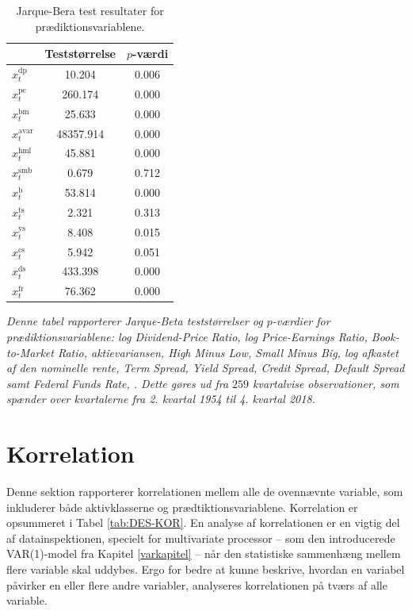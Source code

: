 \documentclass[
  a4paper,
  oneside]{memoir}
\begin{document}
\begin{table}[H]

\caption{\label{tab:JB-TILSTANDSVARIABLE}Jarque-Bera test resultater for prædiktionsvariablene.}
\centering
\begin{threeparttable}
\begin{tabular}[t]{lcc}
\toprule
  & Teststørrelse & $p$-værdi\\
\midrule
\rowcolor{gray!6}  $x_t^{\text{dp}}$ & 10.204 & 0.006\\
$x_t^{\text{pe}}$ & 260.174 & 0.000\\
\rowcolor{gray!6}  $x_t^{\text{bm}}$ & 25.633 & 0.000\\
$x_t^{\text{avar}}$ & 48357.914 & 0.000\\
\rowcolor{gray!6}  $x_t^{\text{hml}}$ & 45.881 & 0.000\\
$x_t^{\text{smb}}$ & 0.679 & 0.712\\
\rowcolor{gray!6}  $x_t^{\text{b}}$ & 53.814 & 0.000\\
$x_t^{\text{ts}}$ & 2.321 & 0.313\\
\rowcolor{gray!6}  $x_t^{\text{ys}}$ & 8.408 & 0.015\\
$x_t^{\text{cs}}$ & 5.942 & 0.051\\
\rowcolor{gray!6}  $x_t^{\text{ds}}$ & 433.398 & 0.000\\
$x_t^{\text{fr}}$ & 76.362 & 0.000\\
\bottomrule
\end{tabular}
\begin{tablenotes}
\item \textit{Denne tabel rapporterer Jarque-Beta teststørrelser og $p$-værdier for prædiktionsvariablene: log Dividend-Price Ratio, log Price-Earnings Ratio, Book-to-Market Ratio, aktievariansen, High Minus Low, Small Minus Big, log afkastet af den nominelle rente, Term Spread, Yield Spread, Credit Spread, Default Spread samt Federal Funds Rate, \citep{Jarque1980}. Dette gøres ud fra $259$ kvartalvise observationer, som spænder over kvartalerne fra 2. kvartal 1954 til 4. kvartal 2018.}
\end{tablenotes}
\end{threeparttable}
\end{table}

\hypertarget{korr}{%
\section{Korrelation}\label{korr}}

Denne sektion rapporterer korrelationen mellem alle de ovennævnte variable, som inkluderer både aktivklasserne og prædtiktionsvariablene. Korrelation er opsummeret i Tabel \ref{tab:DES-KOR}. En analyse af korrelationen er en vigtig del af datainspektionen, specielt for multivariate processor -- som den introducerede VAR(1)-model fra Kapitel \ref{varkapitel} -- når den statistiske sammenhæng mellem flere variable skal uddybes. Ergo for bedre at kunne beskrive, hvordan en variabel påvirker en eller flere andre variabler, analyseres korrelationen på tværs af alle variable.
\end{document}
